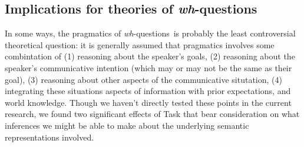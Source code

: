 \documentclass[12pt,letterpaper,table,svgnames,dvipsnames]{article}
\newcommand{\whqs}{\emph{wh}-questions~}
\begin{document}



\subsection{Implications for theories of \whqs}

In some ways, the pragmatics of \whqs is probably the least controversial theoretical question: it is generally assumed that pragmatics involves some combintation of (1) reasoning about the speaker's goals, (2) reasoning about the speaker's communicative intention (which may or may not be the same as their goal), (3) reasoning about other aspects of the communicative situtation, (4) integrating these situations aspects of information with prior expectations, and world knowledge. Though we haven't directly tested these points in the current research, we found two significant effects of Task that bear consideration on what inferences we might be able to make about the underlying semantic representations involved.
\end{document}
